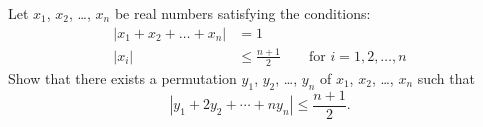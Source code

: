 Let $x_1$, $x_2$, \dots, $x_n$ be real numbers satisfying the conditions:
\begin{align*}
  |x_1 + x_2 + \dots + x_n| &= 1 \\
  |x_i| &\le \frac{n+1}{2} \qquad \text{for } i= 1,2, \dots, n
\end{align*}
Show that there exists a permutation $y_1$, $y_2$, \dots, $y_n$
of $x_1$, $x_2$, \dots, $x_n$ such that
\[ | y_1 + 2 y_2 + \dotsb + n y_n | \leq \frac {n + 1}{2}. \]